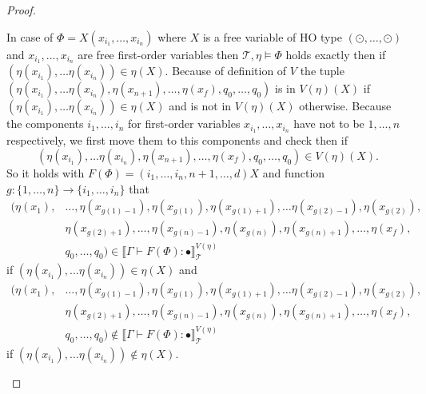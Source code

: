 \begin{proof}
\begin{compactitem}
        \item In case of $\Phi = X(x_{i_1}, \dots, x_{i_n})$ where $X$ is a free variable of HO type $(\odot, \dots,
        \odot)$ and $x_{i_1}, \dots, x_{i_n}$ are free first-order variables then $\mathcal{T}, \eta \models \Phi$
        holds exactly then if $(\eta(x_{i_1}), \dots \eta(x_{i_n})) \in \eta(X)$. Because of definition of $V$ the
        tuple $(\eta(x_{i_1}), \dots \eta(x_{i_n}), \eta(x_{n + 1}), \dots, \eta(x_{f}), q_0, \dots, q_0)$ is in $V
        (\eta)(X)$ if $(\eta(x_{i_1}),\dots \eta(x_{i_n})) \in \eta(X)$ and is not in $V(\eta)(X)$ otherwise. Because
        the components $i_1, \dots, i_n$ for first-order variables $x_{i_1}, \dots, x_{i_n}$ have not to be $1,
        \dots, n$ respectively, we first move them to this components and check then if
        \[(\eta(x_{i_1}), \dots \eta(x_{i_n}), \eta(x_{n + 1}), \dots, \eta(x_{f}), q_0, \dots, q_0) \in V(\eta)(X).\]
        So it holds with $F(\Phi) = {(i_1, \dots, i_n, n+1, \dots, d)}X$ and function $g: \{1, \dots, n\}
        \rightarrow \{i_1, \dots, i_n\}$ that
        \begin{align*}
            (\eta(x_1),& \dots, \eta(x_{g(1)-1}), \eta(x_{g(1)}), \eta(x_{g(1)+1}), \dots \eta(x_{g(2)-1}), \eta
            (x_{g(2)}),\\& \eta(x_{g(2)+1}), \dots, \eta(x_{g(n)-1}), \eta(x_{g(n)}), \eta(x_{g(n)+1}), \dots, \eta
            (x_f),\\& q_0, \dots, q_0) \in \llbracket \Gamma \vdash F(\Phi) \colon \bullet \rrbracket^{V(\eta)
            }_\mathcal{T}
        \end{align*}
        if $(\eta(x_{i_1}), \dots \eta(x_{i_n})) \in \eta(X)$ and
        \begin{align*}
            (\eta(x_1),& \dots, \eta(x_{g(1)-1}), \eta(x_{g(1)}), \eta(x_{g(1)+1}), \dots \eta(x_{g(2)-1}), \eta
            (x_{g(2)}),\\& \eta(x_{g(2)+1}), \dots, \eta(x_{g(n)-1}), \eta(x_{g(n)}), \eta(x_{g(n)+1}), \dots, \eta
            (x_f),\\& q_0, \dots, q_0) \not\in \llbracket \Gamma \vdash F(\Phi) \colon \bullet \rrbracket^{V(\eta)
            }_\mathcal{T}
        \end{align*}
        if $(\eta(x_{i_1}), \dots \eta(x_{i_n})) \not\in \eta(X)$.


\end{compactitem}
\end{proof}
